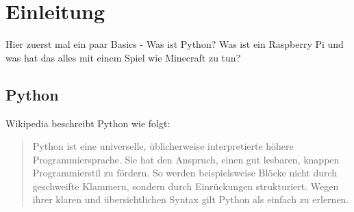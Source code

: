 \section{Einleitung}

Hier zuerst mal ein paar Basics - Was ist Python? Was ist ein Raspberry Pi und was hat das alles mit einem Spiel wie Minecraft zu tun?

\subsection{Python}
Wikipedia beschreibt Python wie folgt:
\begin{quote}
	Python ist eine universelle, üblicherweise interpretierte höhere Programmiersprache. Sie hat den Anspruch, einen gut lesbaren, knappen Programmierstil zu fördern. So werden beispielsweise Blöcke nicht durch geschweifte Klammern, sondern durch Einrückungen strukturiert. Wegen ihrer klaren und übersichtlichen Syntax gilt Python als einfach zu erlernen. \cite{wikipedia_python}
\end{quote}